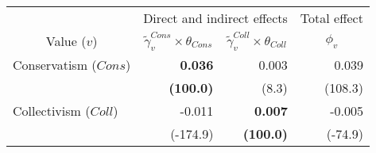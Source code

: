 
\begin{tabular}{lrrr}
\toprule
\multicolumn{1}{c}{ } & \multicolumn{2}{c}{Direct and indirect effects} & \multicolumn{1}{c}{Total effect} \\
\cmidrule(l{3pt}r{3pt}){2-3} \cmidrule(l{3pt}r{3pt}){4-4}
\multicolumn{1}{c}{Value ($v$)} & \multicolumn{1}{c}{$\widetilde{\gamma}^{Cons}_v \times \theta_{Cons}$} & \multicolumn{1}{c}{$\widetilde{\gamma}^{Coll}_v \times \theta_{Coll}$} & \multicolumn{1}{c}{${\phi}_v$}\\
\midrule
Conservatism ($Cons$) & \textbf{0.036} & 0.003 & 0.039\\
 & \textbf{(100.0)} & (8.3) & (108.3)\\
Collectivism ($Coll$) & -0.011 & \textbf{0.007} & -0.005\\
 & (-174.9) & \textbf{(100.0)} & (-74.9)\\
\bottomrule
\end{tabular}
